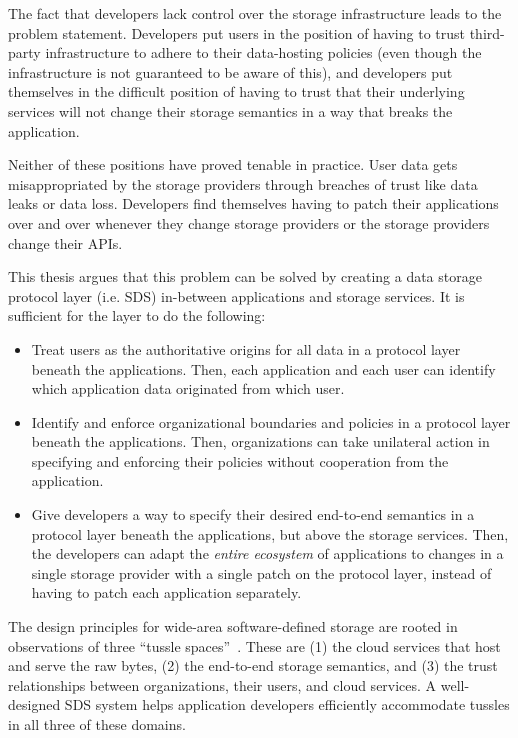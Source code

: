 The fact that developers lack control over the storage infrastructure leads to the problem statement.  Developers
put users in the position of having to trust third-party infrastructure
to adhere to their data-hosting policies (even though the infrastructure is not
guaranteed to be aware of this), and developers put themselves in the difficult
position of having to trust that their underlying services will not change their
storage semantics in a way that breaks the application.

Neither of these
positions have proved tenable in practice.  User data gets misappropriated by the storage
providers through breaches of trust like data leaks or data loss.  Developers
find themselves having to patch their applications over and over whenever they
change storage providers or the storage providers change their APIs.

This thesis argues that this problem can be solved by creating a data storage
protocol layer (i.e. SDS) in-between applications and storage services.  It is sufficient
for the layer to do the following:

\begin{itemize}
   \item Treat users as the authoritative origins for all data in a protocol
      layer beneath the applications.  Then, each application and each user
      can identify which application data originated from which user.
   \item Identify and enforce organizational boundaries and policies in a protocol layer
      beneath the applications.  Then, organizations can take unilateral action
      in specifying and enforcing their policies without cooperation from the
      application.
   \item Give developers a way to specify their desired end-to-end semantics in
      a protocol layer beneath the applications, but above the storage services.
      Then, the developers can adapt the \emph{entire ecosystem} of applications
      to changes in a single storage provider with a
      single patch on the protocol layer,
      instead of having to patch each application separately.
\end{itemize}

The design principles for wide-area software-defined storage are rooted in 
observations of three ``tussle spaces''~\cite{david-clark-tussle-spaces}.
These are (1) the cloud services that host and serve the raw
bytes, (2) the end-to-end storage semantics, and (3) the trust
relationships between organizations, their users, and cloud services.
A well-designed SDS system helps application developers efficiently accommodate tussles
in all three of these domains.

